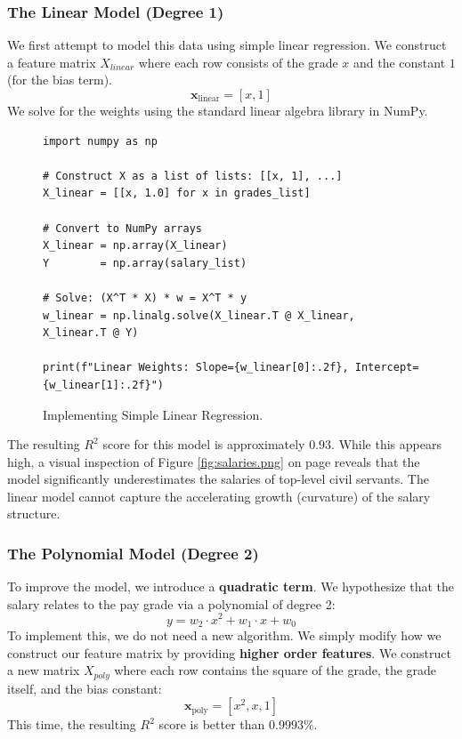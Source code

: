 \subsubsection{The Linear Model (Degree 1)}
We first attempt to model this data using simple linear regression. We construct a feature matrix $X_{linear}$ where each row consists of the grade $x$ and the constant $1$ (for the bias term).
\[
\mathbf{x}_{\text{linear}} = [x, 1]
\]
We solve for the weights using the standard linear algebra library in NumPy.

\begin{figure}[!ht]
\centering
\begin{verbatim}
import numpy as np

# Construct X as a list of lists: [[x, 1], ...]
X_linear = [[x, 1.0] for x in grades_list]

# Convert to NumPy arrays
X_linear = np.array(X_linear)
Y        = np.array(salary_list)

# Solve: (X^T * X) * w = X^T * y
w_linear = np.linalg.solve(X_linear.T @ X_linear, X_linear.T @ Y)

print(f"Linear Weights: Slope={w_linear[0]:.2f}, Intercept={w_linear[1]:.2f}")
\end{verbatim}
\caption{Implementing Simple Linear Regression.}
\label{fig:linear_implementation}
\end{figure}

The resulting $R^2$ score for this model is approximately $0.93$. While this appears high, a visual inspection
of Figure \ref{fig:salaries.png} on page \pageref{fig:salaries.png} reveals that the model significantly
underestimates the salaries of top-level civil servants. The linear model cannot capture the accelerating
growth (curvature) of the salary structure. 

\subsubsection{The Polynomial Model (Degree 2)}
To improve the model, we introduce a \textbf{quadratic term}. We hypothesize that the salary relates to the pay
grade via a polynomial of degree 2:
\[
y = w_2 \cdot x^2 + w_1 \cdot x + w_0
\]
To implement this, we do not need a new algorithm. We simply modify how we construct our feature matrix by providing \textbf{higher order features}. We construct a new matrix $X_{poly}$ where each row contains the square of the grade, the grade itself, and the bias constant:
\[
\mathbf{x}_{\text{poly}} = [x^2, x, 1]
\]
This time, the resulting $R^2$ score is better than $0.9993\%$.

